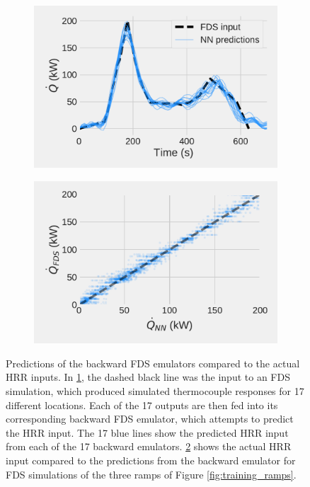 \documentclass{article}
\begin{document}
\begin{figure}[htbp]
  \centering
  \begin{subfigure}[t]{.45\textwidth}
      \centering
      \includegraphics[width=\textwidth,keepaspectratio]{figures/backward_NN_examples.pdf}
      \caption{}
      \label{fig:backward_NN_examples}
  \end{subfigure}
  \begin{subfigure}[t]{.45\textwidth}
      \centering
      \includegraphics[width=\textwidth ,keepaspectratio]{figures/backward_error_scatter.pdf}
      \caption{}
      \label{fig:backward_error_scatter}
  \end{subfigure}
  \caption{Predictions of the backward FDS emulators compared to the actual HRR inputs. In \protect\ref{fig:backward_NN_examples}, the dashed black line was the input to an FDS simulation, which produced simulated thermocouple responses for 17 different locations. Each of the 17 outputs are then fed into its corresponding backward FDS emulator, which attempts to predict the HRR input. The 17 blue lines show the predicted HRR input from each of the 17 backward emulators. \protect\ref{fig:backward_error_scatter} shows the actual HRR input compared to the predictions from the backward emulator for FDS simulations of the three ramps of Figure \protect\ref{fig:training_ramps}.} 
  \label{fig:backward_examples}
\end{figure}
\end{document}
